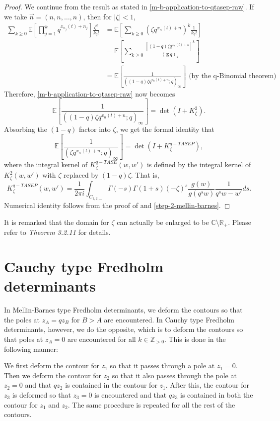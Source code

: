 \begin{proof}
We continue from the result as stated in \eqref{m-b-application-to-qtasep-raw}. If we take $\vec{n} = (n,n,\dots,n)$, then for $|\zeta| < 1$,
\begin{align*}
\sum_{k \ge 0} \mathbb{E} \left[ \prod_{j=1}^k q^{x_{n_j}(t)+n_j} \right] \frac{\zeta^k}{k_q!} &= \mathbb{E} \left[ \sum_{k \ge 0} (\zeta q^{x_n(t) + n})^k \frac{1}{k_q!} \right]\\
&= \mathbb{E} \left[ \sum_{k \ge 0} \frac{[(1-q) \zeta q^{x_n(t) + n}]^k}{(q;q)_k} \right]\\
&= \mathbb{E} \left[ \frac{1}{( (1-q) \zeta q^{x_n(t) + n} ;q)_{\infty}} \right] \text{ (by the q-Binomial theorem) }
\end{align*}
Therefore, \eqref{m-b-application-to-qtasep-raw} now becomes $$\mathbb{E} \left[ \frac{1}{( (1-q) \zeta q^{x_n(t) + n} ;q)_{\infty}} \right] = \det(I+K^2_{\zeta}).$$
Absorbing the $(1-q)$ factor into $\zeta$, we get the formal identity that $$\mathbb{E} \left[ \frac{1}{(\zeta q^{x_n(t)+n}; q)_{\infty}} \right] = \det(I+K_{\zeta}^{q-TASEP}),$$ where the integral kernel of $K^{q-TASE}_{\zeta} (w,w')$ is defined by the integral kernel of $K^2_{\zeta}(w,w')$ with $\zeta$ replaced by $(1-q)\zeta$. That is, $$K_{\zeta}^{q-TASEP} (w, w') = \frac{1}{2 \pi i} \int_{C_{1,2, \dots}} \Gamma(-s) \Gamma(1+s) (-\zeta)^s \frac{g(w)}{g(q^s w)} \frac{1}{q^s w - w'}ds.$$
Numerical identity follows from the proof of  and \ref{step-2-mellin-barnes}.
\end{proof}

\begin{remark}
It is remarked that the domain for $\zeta$ can actually be enlarged to be $\mathbb{C} \setminus \mathbb{R}_+$. Please refer to \cite{macdonald2014} \textit{Theorem 3.2.11} for details. 
\end{remark}

\section{Cauchy type Fredholm determinants}
In Mellin-Barnes type Fredholm determinants, we deform the contours so that the poles at $z_A = qz_B$ for $B > A$ are encountered. In Cauchy type Fredholm determinants, however, we do the opposite, which is to deform the contours so that poles at $z_A = 0$ are encountered for all $k \in \mathbb{Z}_{>0}$. This is done in the following manner:

We first deform the contour for $z_1$ so that it passes through a pole at $z_1 = 0$. Then we deform the contour for $z_2$ so that it also passes through the pole at $z_2 = 0$ and that $qz_2$ is contained in the contour for $z_1$. After this, the contour for $z_3$ is deformed so that $z_3 = 0$ is encountered and that $qz_3$ is contained in both the contour for $z_1$ and $z_2$. The same procedure is repeated for all the rest of the contours.


